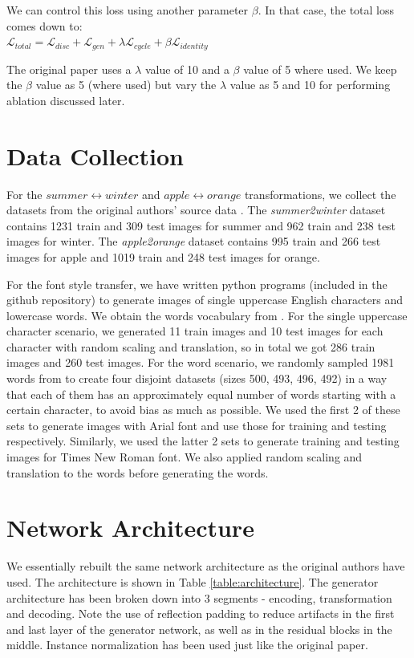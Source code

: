 \documentclass[10pt,twocolumn,letterpaper]{article}
\begin{document}
We can control this loss using another parameter $\beta$. In that case, the total loss comes down to:\\

$\mathcal{L}_{total} = \mathcal{L}_{disc} + \mathcal{L}_{gen} + \lambda\mathcal{L}_{cycle} + \beta\mathcal{L}_{identity}$

The original paper uses a $\lambda$ value of 10 and a $\beta$ value of 5 where used.
We keep the $\beta$ value as 5 (where used) but vary the $\lambda$ value as 5 and 10 for performing ablation discussed later.

\section{Data Collection}

For the $summer \leftrightarrow winter$ and $apple \leftrightarrow orange$ transformations, we collect 
the datasets from the original authors' source data \cite{data1}. The \textit{summer2winter} dataset contains 1231 train and 309 test images for summer and 962 train and 238 test images for winter. The \textit{apple2orange} dataset contains 995 train and 266 test images for apple and 1019 train and 248 test images for orange.

For the font style transfer, we have written python programs (included in the github repository) to generate images of single uppercase English characters and lowercase words. We obtain the words vocabulary from \cite{data2}. For the single uppercase character scenario, we generated 11 train images and 10 test images for each character with random scaling and translation, so in total we got 286 train images and 260 test images. For the word scenario, we randomly sampled 1981 words from \cite{data2} to create four disjoint datasets (sizes 500, 493, 496, 492) in a way that each of them has an approximately equal number of words starting with a certain character, to avoid bias as much as possible. We used the first 2 of these sets to generate images with Arial font and use those for training and testing respectively. Similarly, we used the latter 2 sets to generate training and testing images for Times New Roman font. We also applied random scaling and translation to the words before generating the words. 

\section{Network Architecture}
We essentially rebuilt the same network architecture as the original authors 
\cite{cyclegan} have used. The architecture is shown in Table \ref{table:architecture}.
The generator architecture has been broken down into 3 segments - encoding, transformation
and decoding. Note the use of reflection padding to reduce artifacts in the first and last layer of the
generator network, as well as in the residual blocks in the middle. Instance normalization has been used
just like the original paper.
\end{document}
